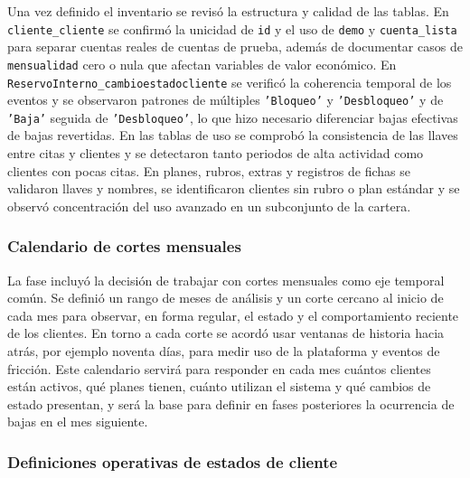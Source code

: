 Una vez definido el inventario se revisó la estructura y calidad de las tablas. En \texttt{cliente\_\hspace{0pt}cliente} se confirmó la unicidad de \texttt{id} y el uso de \texttt{demo} y \texttt{cuenta\_\hspace{0pt}lista} para separar cuentas reales de cuentas de prueba, además de documentar casos de \texttt{mensualidad} cero o nula que afectan variables de valor económico. En \texttt{ReservoInterno\_\hspace{0pt}cambioestadocliente} se verificó la coherencia temporal de los eventos y se observaron patrones de múltiples \texttt{'Bloqueo'} y \texttt{'Desbloqueo'} y de \texttt{'Baja'} seguida de \texttt{'Desbloqueo'}, lo que hizo necesario diferenciar bajas efectivas de bajas revertidas. En las tablas de uso se comprobó la consistencia de las llaves entre citas y clientes y se detectaron tanto periodos de alta actividad como clientes con pocas citas. En planes, rubros, extras y registros de fichas se validaron llaves y nombres, se identificaron clientes sin rubro o plan estándar y se observó concentración del uso avanzado en un subconjunto de la cartera.

\subsubsection{Calendario de cortes mensuales}

La fase incluyó la decisión de trabajar con cortes mensuales como eje temporal común. Se definió un rango de meses de análisis y un corte cercano al inicio de cada mes para observar, en forma regular, el estado y el comportamiento reciente de los clientes. En torno a cada corte se acordó usar ventanas de historia hacia atrás, por ejemplo noventa días, para medir uso de la plataforma y eventos de fricción. Este calendario servirá para responder en cada mes cuántos clientes están activos, qué planes tienen, cuánto utilizan el sistema y qué cambios de estado presentan, y será la base para definir en fases posteriores la ocurrencia de bajas en el mes siguiente.

\subsubsection{Definiciones operativas de estados de cliente}


